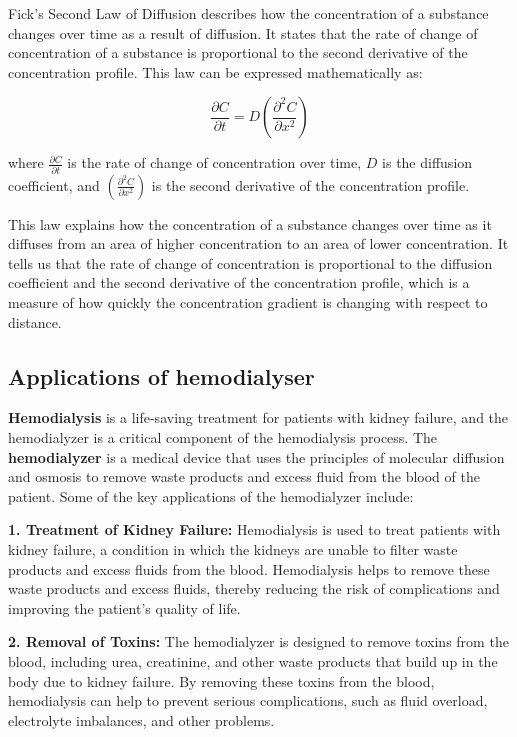 \documentclass[12pt, a4paper]{article} %
\begin{document}
Fick's Second Law of Diffusion describes how the concentration of a substance changes over time as a result of diffusion. It states that the rate of change of concentration of a substance is proportional to the second derivative of the concentration profile. This law can be expressed mathematically as:

\[\frac{\partial C}{\partial t} = D \left(\frac{\partial^2 C}{\partial x^2}\right)\]

where $\displaystyle \frac{\partial C}{\partial t}$ is the rate of change of concentration over time, $D$ is the diffusion coefficient, and $\displaystyle \left(\frac{\partial^2 C}{\partial x^2}\right)$ is the second derivative of the concentration profile.

This law explains how the concentration of a substance changes over time as it diffuses from an area of higher concentration to an area of lower concentration. It tells us that the rate of change of concentration is proportional to the diffusion coefficient and the second derivative of the concentration profile, which is a measure of how quickly the concentration gradient is changing with respect to distance.

\subsection*{Applications of hemodialyser}

{\bf Hemodialysis} is a life-saving treatment for patients with kidney failure, and the hemodialyzer is a critical component of the hemodialysis process. The {\bf hemodialyzer} is a medical device that uses the principles of molecular diffusion and osmosis to remove waste products and excess fluid from the blood of the patient. Some of the key applications of the hemodialyzer include:

{\bf 1. Treatment of Kidney Failure:} Hemodialysis is used to treat patients with kidney failure, a condition in which the kidneys are unable to filter waste products and excess fluids from the blood. Hemodialysis helps to remove these waste products and excess fluids, thereby reducing the risk of complications and improving the patient's quality of life.

{\bf 2. Removal of Toxins:} The hemodialyzer is designed to remove toxins from the blood, including urea, creatinine, and other waste products that build up in the body due to kidney failure. By removing these toxins from the blood, hemodialysis can help to prevent serious complications, such as fluid overload, electrolyte imbalances, and other problems.
\end{document}
